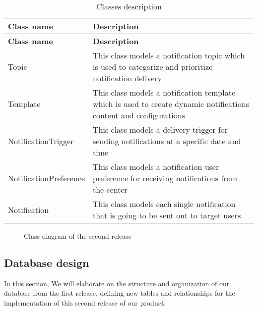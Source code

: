 \begin{longtable}{ | m{} | m{} | }
    \caption{Classes description}                                                                                                               \\
    \hline
    \textbf{Class name}    & \textbf{Description}                                                                                               \\
    \hline
    \endfirsthead
    \hline
    \textbf{Class name}    & \textbf{Description}                                                                                               \\
    \hline
    \endhead
    \endfoot
    \hline
    \endlastfoot
    Topic                  & This class models a notification topic which is used to categorize and prioritize notification delivery            \\
    \hline
    Template               & This class models a notification template which is used to create dynamic notifications content and configurations \\
    \hline
    NotificationTrigger    & This class models a delivery trigger for sending notifications at a specific date and time                         \\
    \hline
    NotificationPreference & This class models a notification user preference for receiving notifications from the center                       \\
    \hline
    Notification           & This class models each single notification that is going to be sent out to target users                            \\
    \hline
\end{longtable}

\begin{landscape}
    \begin{figure}[hbt!]
        \centering
        
        \caption{Class diagram of the second release}
        \label{r2-class}
    \end{figure}
\end{landscape}

\subsection{Database design}
In this section, We will elaborate on the structure and organization of our database from the first release,
defining new tables and relationships for the implementation of this second release of our product.

